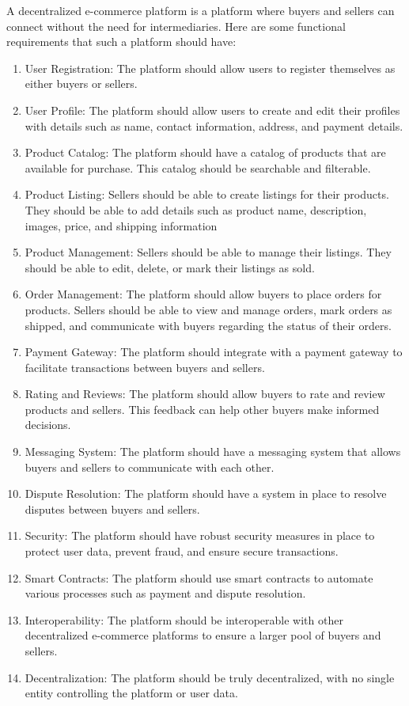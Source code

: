 \documentclass{report}
\begin{document}
  
  A decentralized e-commerce platform is a platform where buyers and sellers can connect without the need for intermediaries. Here are some functional requirements that such a platform should have:

\begin{enumerate}
        \item User Registration: The platform should allow users to register themselves as either buyers or sellers. \\
    
    \item User Profile: The platform should allow users to create and edit their profiles with details such as name, contact information, address, and payment details. \\

    \item  Product Catalog: The platform should have a catalog of products that are available for purchase. This catalog should be searchable and filterable.

\item Product Listing: Sellers should be able to create listings for their products. They should be able to add details such as product name, description, images, price, and shipping information
\item Product Management: Sellers should be able to manage their listings. They should be able to edit, delete, or mark their listings as sold.
\item Order Management: The platform should allow buyers to place orders for products. Sellers should be able to view and manage orders, mark orders as shipped, and communicate with buyers regarding the status of their orders.
\item Payment Gateway: The platform should integrate with a payment gateway to facilitate transactions between buyers and sellers.
\item Rating and Reviews: The platform should allow buyers to rate and review products and sellers. This feedback can help other buyers make informed decisions.
\item Messaging System: The platform should have a messaging system that allows buyers and sellers to communicate with each other.
\item Dispute Resolution: The platform should have a system in place to resolve disputes between buyers and sellers.
\item Security: The platform should have robust security measures in place to protect user data, prevent fraud, and ensure secure transactions.

\item Smart Contracts: The platform should use smart contracts to automate various processes such as payment and dispute resolution.
\item Interoperability: The platform should be interoperable with other decentralized e-commerce platforms to ensure a larger pool of buyers and sellers.
\item Decentralization: The platform should be truly decentralized, with no single entity controlling the platform or user data.
\end{enumerate}
\end{document}
